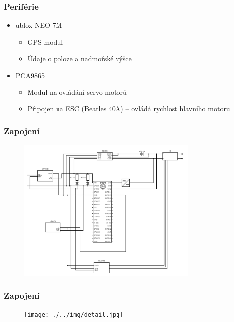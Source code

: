 \documentclass[aspectratio=43]{beamer}
\begin{document}
\begin{frame}[fragile]
	\frametitle{Periférie}
	\begin{itemize}
		\item ublox NEO 7M
			\begin{itemize}
				\item GPS modul
				\item Údaje o poloze a nadmořské výšce
			\end{itemize}
		\item PCA9865
			\begin{itemize}
				\item Modul na ovládání servo motorů
				\item Připojen na ESC (Beatles 40A) -- ovládá rychlost hlavního motoru
			\end{itemize}
	\end{itemize}
\end{frame}

\begin{frame}[fragile]
	\frametitle{Zapojení}
	\begin{figure}[h]
		\centering
		\includegraphics[height=7cm]{./../img/schema.png}
	\end{figure}
\end{frame}

\begin{frame}[fragile]
	\frametitle{Zapojení}
	\begin{figure}[h]
		\centering
		\texttt{[image: ./../img/detail.jpg]}
	\end{figure}
\end{frame}
\end{document}
